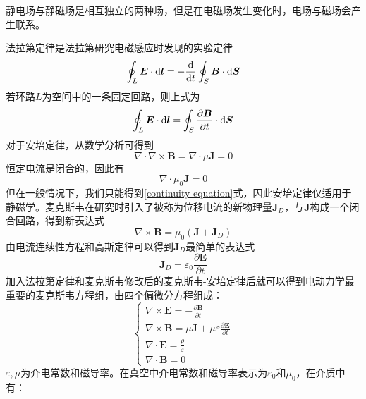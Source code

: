 \documentclass[UTF8,a4paper,10pt]{ctexart}
\begin{document}
\begin{multicols}{2}
        静电场与静磁场是相互独立的两种场，但是在电磁场发生变化时，电场与磁场会产生联系。\par
        法拉第定律是法拉第研究电磁感应时发现的实验定律
        \begin{equation}
            \oint_L\bm{E}\cdot{\rm d}\bm{l} = -\frac{{\rm d}}{{\rm d}t}\oint_S\bm{B}\cdot{\rm d}\bm{S}
        \end{equation}
        若环路$L$为空间中的一条固定回路，则上式为
        \begin{equation}
            \oint_L\bm{E}\cdot{\rm d}\bm{l} = \oint_S\frac{\partial\bm{B}}{\partial t}\cdot{\rm d}\bm{S}
        \end{equation}
        对于安培定律，从数学分析可得到
        \begin{equation}
            \nabla\cdot\nabla\times\bm{B} = \nabla\cdot\mu\bm{J} = 0
        \end{equation}
        恒定电流是闭合的，因此有
        \begin{equation}
            \nabla\cdot\mu_0\bm{J} = 0
        \end{equation}
        但在一般情况下，我们只能得到\eqref{continuity equation}式，因此安培定律仅适用于静磁学。麦克斯韦在研究时引入了被称为位移电流的新物理量$\bm{J}_D$，与$\bm{J}$构成一个闭合回路，得到新表达式
        \begin{equation}
            \nabla\times\bm{B} = \mu_0(\bm{J}+\bm{J}_D)
        \end{equation}
        由电流连续性方程和高斯定律可以得到$\bm{J}_D$最简单的表达式
        \begin{equation}
            \bm{J}_D = \varepsilon_0\frac{\partial\bm{E}}{\partial t}
        \end{equation}
        加入法拉第定律和麦克斯韦修改后的麦克斯韦-安培定律后就可以得到电动力学最重要的麦克斯韦方程组，由四个偏微分方程组成：
        \begin{equation}\label{Maxwell's equations}
            \left\{\begin{array}{l}
                \nabla\times\bm{E} = -\frac{\partial\bm{B}}{\partial t}\\
                \nabla\times\bm{B} = \mu\bm{J}+\mu\varepsilon\frac{\partial\bm{E}}{\partial t}\\
                \nabla\cdot\bm{E} = \frac{\rho}{\varepsilon}\\
                \nabla\cdot\bm{B} = 0
            \end{array}\right.
        \end{equation}
        $\varepsilon,\mu$为介电常数和磁导率。在真空中介电常数和磁导率表示为$\varepsilon_0$和$\mu_0$，在介质中有：

\end{multicols}
\end{document}
